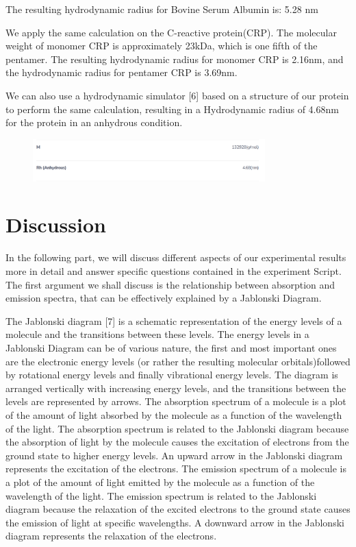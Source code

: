 \documentclass[a4paper,english,12pt,bibliography=totoc]{scrreprt}
\begin{document}
The resulting hydrodynamic radius for Bovine Serum Albumin is: 5.28 nm 

We apply the same calculation on the  C-reactive protein(CRP). The molecular weight of monomer CRP is approximately 23kDa, which is one fifth of the pentamer. The resulting hydrodynamic radius for monomer CRP is 2.16nm, and the hydrodynamic radius for pentamer CRP is 3.69nm.

We can also use a hydrodynamic simulator [6] based on a structure of our protein to perform the same calculation, resulting in a Hydrodynamic radius of 4.68nm for the protein in an anhydrous condition.

\begin{figure}[H]
    \centering
    \includegraphics[width=0.8\textwidth]{Calculator.png}
    \label{fig:ViolinPlot}
\end{figure}


\section{Discussion}
\label{sec:methods}


 In the following part, we will discuss different aspects of our experimental results more in detail and answer specific questions contained in the experiment Script.
 The first argument we shall discuss is the relationship between absorption and emission spectra, that can be effectively explained by a Jablonski Diagram. 
 
 The Jablonski diagram [7] is a schematic representation of the energy levels of a molecule and the transitions between these levels. The energy levels in a Jablonski Diagram can be of various nature, the first and most important ones are the electronic energy levels (or rather the resulting molecular orbitals)followed by rotational energy levels and finally vibrational energy levels. The diagram is arranged vertically with increasing energy levels, and the transitions between the levels are represented by arrows. The absorption spectrum of a molecule is a plot of the amount of light absorbed by the molecule as a function of the wavelength of the light. The absorption spectrum is related to the Jablonski diagram because the absorption of light by the molecule causes the excitation of electrons from the ground state to higher energy levels. An upward arrow in the Jablonski diagram represents the excitation of the electrons. The emission spectrum of a molecule is a plot of the amount of light emitted by the molecule as a function of the wavelength of the light. The emission spectrum is related to the Jablonski diagram because the relaxation of the excited electrons to the ground state causes the emission of light at specific wavelengths. A downward arrow in the Jablonski diagram represents the relaxation of the electrons.
 
\end{document}
